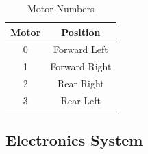 \documentclass[letterpaper,12pt]{article}
\begin{document}
\begin{table}[h!]
  \centering
  \begin{tabular}{| c | c |}
    \hline
    \textbf{Motor} & \textbf{Position} \\
    \hline
    0 & Forward Left \\
    \hline
    1 & Forward Right \\
    \hline
    2 & Rear Right \\
    \hline
    3 & Rear Left \\
    \hline
  \end{tabular}
  \caption{Motor Numbers}
  \label{tab:motor_nums}
\end{table}

\subsection{Electronics System}
\end{document}
